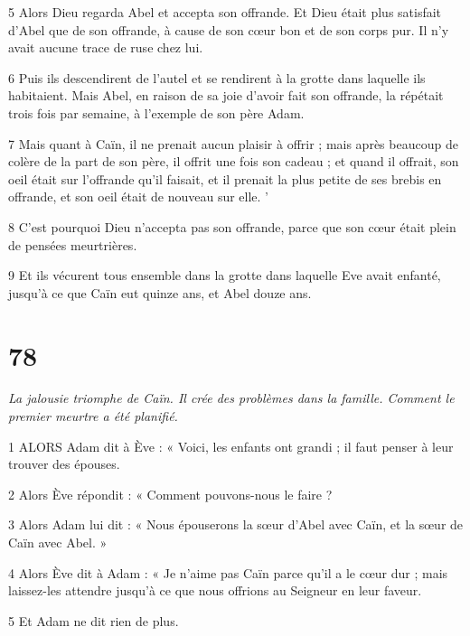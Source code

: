 \par 5 Alors Dieu regarda Abel et accepta son offrande. Et Dieu était plus satisfait d'Abel que de son offrande, à cause de son cœur bon et de son corps pur. Il n’y avait aucune trace de ruse chez lui.

\par 6 Puis ils descendirent de l'autel et se rendirent à la grotte dans laquelle ils habitaient. Mais Abel, en raison de sa joie d'avoir fait son offrande, la répétait trois fois par semaine, à l'exemple de son père Adam.

\par 7 Mais quant à Caïn, il ne prenait aucun plaisir à offrir ; mais après beaucoup de colère de la part de son père, il offrit une fois son cadeau ; et quand il offrait, son oeil était sur l'offrande qu'il faisait, et il prenait la plus petite de ses brebis en offrande, et son oeil était de nouveau sur elle. '

\par 8 C'est pourquoi Dieu n'accepta pas son offrande, parce que son cœur était plein de pensées meurtrières.

\par 9 Et ils vécurent tous ensemble dans la grotte dans laquelle Eve avait enfanté, jusqu'à ce que Caïn eut quinze ans, et Abel douze ans.

\chapter{78}

\par \textit{La jalousie triomphe de Caïn. Il crée des problèmes dans la famille. Comment le premier meurtre a été planifié.}

\par 1 ALORS Adam dit à Ève : « Voici, les enfants ont grandi ; il faut penser à leur trouver des épouses.

\par 2 Alors Ève répondit : « Comment pouvons-nous le faire ?

\par 3 Alors Adam lui dit : « Nous épouserons la sœur d'Abel avec Caïn, et la sœur de Caïn avec Abel. »

\par 4 Alors Ève dit à Adam : « Je n'aime pas Caïn parce qu'il a le cœur dur ; mais laissez-les attendre jusqu'à ce que nous offrions au Seigneur en leur faveur.

\par 5 Et Adam ne dit rien de plus.

